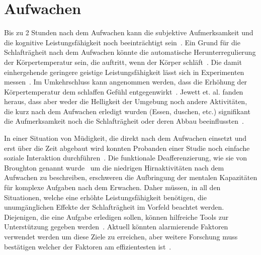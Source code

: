 \section{Aufwachen}\label{sec:relatedWork.aufwachen}

Bis zu 2 Stunden nach dem Aufwachen kann die subjektive Aufmerksamkeit und die kognitive Leistungsfähigkeit noch beeinträchtigt sein~\cite{jewett1999time}. Ein Grund für die Schlafträgheit nach dem Aufwachen könnte die automatische Herunterregulierung der Körpertemperatur sein, die auftritt, wenn der Körper schläft~\cite{dinges1990you}. Die damit einhergehende geringere geistige Leistungsfähigkeit lässt sich in Experimenten messen~\cite{dinges1990you}. 
Im Umkehrschluss kann angenommen werden, dass die Erhöhung der Körpertemperatur dem schlaffen Gefühl entgegenwirkt~\cite{jewett1999time}.
Jewett et. al. fanden heraus, dass aber weder die Helligkeit der Umgebung noch andere Aktivitäten, die kurz nach dem Aufwachen erledigt wurden (Essen, duschen, etc.) signifikant die Aufmerksamkeit noch die Schlafträgheit oder deren Abbau beeinflussten~\cite{jewett1999time}.

In einer Situation von Müdigkeit, die direkt nach dem Aufwachen einsetzt und erst über die Zeit abgebaut wird konnten Probanden einer Studie noch einfache soziale Interaktion durchführen~\cite{dinges1990you}. 
Die funktionale Deafferenzierung, wie sie von Broughton genannt wurde~\cite{broughton1968sleep} um die niedrigen Hirnaktivitäten nach dem Aufwachen zu beschreiben, erschweren die Aufbringung der mentalen Kapazitäten für komplexe Aufgaben nach dem Erwachen. 
Daher müssen, in all den Situationen, welche eine erhöhte Leistungsfähigkeit benötigen, die unumgänglichen Effekte der Schlafträgheit im Vorfeld beachtet werden. 
Diejenigen, die eine Aufgabe erledigen sollen, können hilfreiche Tools zur Unterstützung gegeben werden~\cite{ferrara2000sleep}. 
Aktuell könnten alarmierende Faktoren verwendet werden um diese Ziele zu erreichen, aber weitere Forschung muss bestätigen welcher der Faktoren am effizientesten ist~\cite{ferrara2000sleep}.

\cite{online:muedesGehirn}

